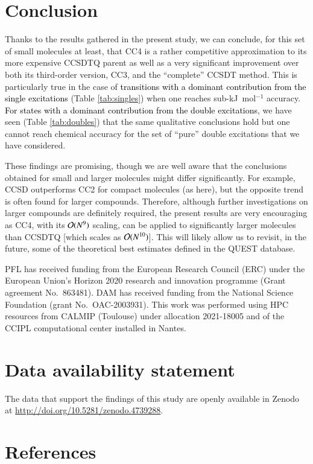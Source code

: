 \documentclass[aip,jcp,reprint,noshowkeys,superscriptaddress]{revtex4-1}
\newcommand{\alert}[1]{\textcolor{black}{#1}}
\begin{document}
\section{Conclusion}

Thanks to the results gathered in the present study, we can conclude, for this set of small molecules at least, that CC4 is a rather competitive approximation to its more expensive CCSDTQ parent as well as a very significant improvement over both its third-order version, CC3, and the ``complete'' CCSDT method.
This is particularly true in the case of \alert{transitions with a dominant contribution from the single excitations} (Table \ref{tab:singles}) when one reaches sub-kJ~mol$^{-1}$ accuracy.
\alert{For states with a dominant contribution from the double excitations}, we have seen (Table \ref{tab:doubles}) that the same qualitative conclusions hold but one cannot reach chemical accuracy for the set of ``pure'' double excitations that we have considered.

These findings are promising, though we are well aware that the conclusions obtained for small and larger molecules might differ significantly.
For example, CCSD outperforms CC2 for compact molecules (as here), but the opposite trend is often found for larger compounds.\cite{Loos_2018a,Loos_2020a,Veril_2021} 
Therefore, although further investigations on larger compounds are definitely required, the present results are very encouraging as CC4, with its $\order*{N^9}$ scaling, can be applied to significantly larger molecules than CCSDTQ [which scales as $\order*{N^{10}}$]. 
This will likely allow us to revisit, in the future, some of the theoretical best estimates defined in the QUEST database.\cite{Loos_2020a,Veril_2021}

\begin{acknowledgements}
PFL has received funding from the European Research Council (ERC) under the European Union's Horizon 2020 research and innovation programme (Grant agreement No.~863481).
DAM has received funding from the National Science Foundation (grant No.~OAC-2003931).
This work was performed using HPC resources from CALMIP (Toulouse) under allocation 2021-18005 and of the CCIPL computational center installed in Nantes.
\end{acknowledgements}

\section*{Data availability statement}
The data that support the findings of this study are openly available in Zenodo at \href{http://doi.org/10.5281/zenodo.4739288}{http://doi.org/10.5281/zenodo.4739288}.

\section*{References}

\end{document}
